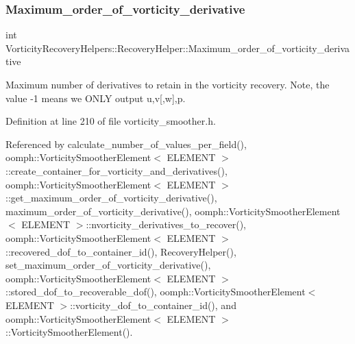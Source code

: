 \subsubsection{\texorpdfstring{Maximum\+\_\+order\+\_\+of\+\_\+vorticity\+\_\+derivative}{Maximum\_order\_of\_vorticity\_derivative}}
{\footnotesize\ttfamily int Vorticity\+Recovery\+Helpers\+::\+Recovery\+Helper\+::\+Maximum\+\_\+order\+\_\+of\+\_\+vorticity\+\_\+derivative\hspace{0.3cm}{\ttfamily [private]}}



Maximum number of derivatives to retain in the vorticity recovery. Note, the value -\/1 means we O\+N\+LY output u,v\mbox{[},w\mbox{]},p. 



Definition at line 210 of file vorticity\+\_\+smoother.\+h.



Referenced by calculate\+\_\+number\+\_\+of\+\_\+values\+\_\+per\+\_\+field(), oomph\+::\+Vorticity\+Smoother\+Element$<$ E\+L\+E\+M\+E\+N\+T $>$\+::create\+\_\+container\+\_\+for\+\_\+vorticity\+\_\+and\+\_\+derivatives(), oomph\+::\+Vorticity\+Smoother\+Element$<$ E\+L\+E\+M\+E\+N\+T $>$\+::get\+\_\+maximum\+\_\+order\+\_\+of\+\_\+vorticity\+\_\+derivative(), maximum\+\_\+order\+\_\+of\+\_\+vorticity\+\_\+derivative(), oomph\+::\+Vorticity\+Smoother\+Element$<$ E\+L\+E\+M\+E\+N\+T $>$\+::nvorticity\+\_\+derivatives\+\_\+to\+\_\+recover(), oomph\+::\+Vorticity\+Smoother\+Element$<$ E\+L\+E\+M\+E\+N\+T $>$\+::recovered\+\_\+dof\+\_\+to\+\_\+container\+\_\+id(), Recovery\+Helper(), set\+\_\+maximum\+\_\+order\+\_\+of\+\_\+vorticity\+\_\+derivative(), oomph\+::\+Vorticity\+Smoother\+Element$<$ E\+L\+E\+M\+E\+N\+T $>$\+::stored\+\_\+dof\+\_\+to\+\_\+recoverable\+\_\+dof(), oomph\+::\+Vorticity\+Smoother\+Element$<$ E\+L\+E\+M\+E\+N\+T $>$\+::vorticity\+\_\+dof\+\_\+to\+\_\+container\+\_\+id(), and oomph\+::\+Vorticity\+Smoother\+Element$<$ E\+L\+E\+M\+E\+N\+T $>$\+::\+Vorticity\+Smoother\+Element().

\mbox{\label{classVorticityRecoveryHelpers_1_1RecoveryHelper_a8c3f392e7798627cc08eeebdfa535ff0}} 
